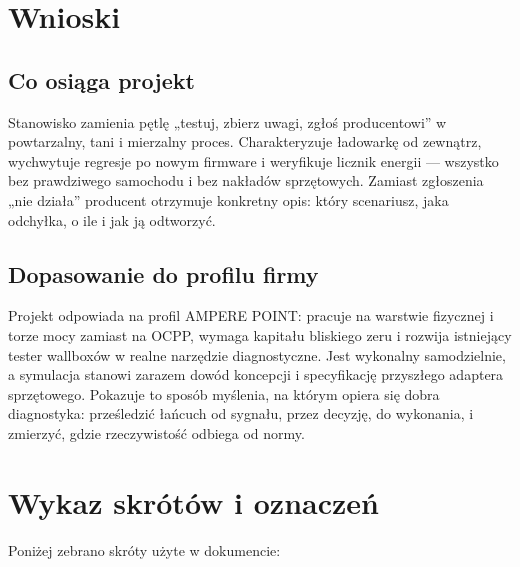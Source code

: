 \documentclass[11pt]{article}
\begin{document}
\section{Wnioski}

\subsection{Co osiąga projekt}

Stanowisko zamienia pętlę „testuj, zbierz uwagi, zgłoś producentowi” w powtarzalny, tani i mierzalny proces. Charakteryzuje ładowarkę od zewnątrz, wychwytuje regresje po nowym firmware i weryfikuje licznik energii --- wszystko bez prawdziwego samochodu i bez nakładów sprzętowych. Zamiast zgłoszenia „nie działa” producent otrzymuje konkretny opis: który scenariusz, jaka odchyłka, o ile i jak ją odtworzyć.

\subsection{Dopasowanie do profilu firmy}

Projekt odpowiada na profil AMPERE POINT: pracuje na warstwie fizycznej i torze mocy zamiast na OCPP, wymaga kapitału bliskiego zeru i rozwija istniejący tester wallboxów w realne narzędzie diagnostyczne. Jest wykonalny samodzielnie, a symulacja stanowi zarazem dowód koncepcji i specyfikację przyszłego adaptera sprzętowego. Pokazuje to sposób myślenia, na którym opiera się dobra diagnostyka: prześledzić łańcuch od sygnału, przez decyzję, do wykonania, i zmierzyć, gdzie rzeczywistość odbiega od normy.

\section{Wykaz skrótów i oznaczeń}

Poniżej zebrano skróty użyte w dokumencie:
\end{document}
